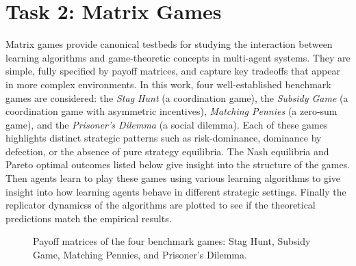 \section{Task 2: Matrix Games}

Matrix games provide canonical testbeds for studying the interaction between learning algorithms and game-theoretic concepts in multi-agent systems. They are simple, fully specified by payoff matrices, and capture key tradeoffs that appear in more complex environments. In this work, four well-established benchmark games are considered: the \emph{Stag Hunt} (a coordination game), the \emph{Subsidy Game} (a coordination game with asymmetric incentives), \emph{Matching Pennies} (a zero-sum game), and the \emph{Prisoner’s Dilemma} (a social dilemma). Each of these games highlights distinct strategic patterns such as risk-dominance, dominance by defection, or the absence of pure strategy equilibria. The Nash equilibria and Pareto optimal outcomes listed below give insight into the structure of the games. Then agents learn to play these games using various learning algorithms to give insight into how learning agents behave in different strategic settings. Finally the replicator dynamicss of the algorithms are plotted to see if the theoretical predictions match the empirical results.

\begin{figure}[h]
    \centering
    \caption{Payoff matrices of the four benchmark games: Stag Hunt, Subsidy Game, Matching Pennies, and Prisoner’s Dilemma.}
\end{figure}



